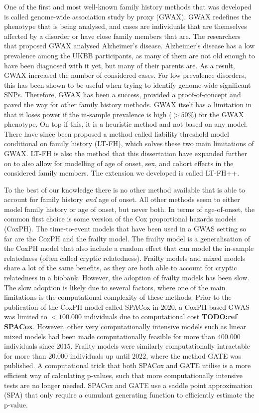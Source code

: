 One of the first and most well-known family history methods that was developed is called genome-wide association study by proxy (GWAX). GWAX redefines the phenotype that is being analysed, and cases are individuals that are themselves affected by a disorder or have close family members that are. The researchers that proposed GWAX analysed Alzheimer's disease. Alzheimer's disease has a low prevalence among the UKBB participants, as many of them are not old enough to have been diagnosed with it yet, but many of their parents are. As a result, GWAX increased the number of considered cases. For low prevalence disorders, this has been shown to be useful when trying to identify genome-wide significant SNPs. Therefore, GWAX has been a success, provided a proof-of-concept and paved the way for other family history methods. GWAX itself has a limitation in that it loses power if the in-sample prevalence is high ($ >50\% $) for the GWAX phenotype. On top if this, it is a heuristic method and not based on any model. There have since been proposed a method called liability threshold model conditional on family history (LT-FH), which solves these two main limitations of GWAX. LT-FH is also the method that this dissertation have expanded further on to also allow for modelling of age of onset, sex, and cohort effects in the considered family members. The extension we developed is called LT-FH++.

To the best of our knowledge there is no other method available that is able to account for family history \textit{and} age of onset. All other methods seem to either model family history or age of onset, but never both. In terms of age-of-onset, the common first choice is some version of the Cox proportional hazards models (CoxPH). The time-to-event models that have been used in a GWAS setting so far are the CoxPH and the frailty model. The frailty model is a generalisation of the CoxPH model that also include a random effect that can model the in-sample relatedness (often called cryptic relatedness). Frailty models and mixed models share a lot of the same benefits, as they are both able to account for cryptic relatedness in a biobank. However, the adoption of frailty models has been slow. The slow adoption is likely due to several factors, where one of the main limitations is the computational complexity of these methods. Prior to the publication of the CoxPH model called SPACox in $ 2020 $, a CoxPH based GWAS was limited to $ <100.000 $ individuals due to computational cost \textbf{TODO:ref SPACox}. However, other very computationally intensive models such as linear mixed models had been made computationally feasible for more than $ 400.000 $ individuals since $ 2015 $. Frailty models were similarly computationally intractable for more than $ 20.000 $ individuals up until $ 2022 $, where the method GATE was published. A computational trick that both SPACox and GATE utilise is a more efficient way of calculating p-values, such that more computationally intensive tests are no longer needed. SPACox and GATE use a saddle point approximation (SPA) that only require a cumulant generating function to efficiently estimate the p-value.

